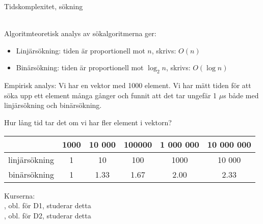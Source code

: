 \begin{Slide}{Tidskomplexitet, sökning}\SlideFontSmall

\\Algoritmteoretisk analys av sökalgoritmerna ger:
\begin{itemize}
\item Linjärsökning: tiden är proportionell mot $n$, skrivs: $O(n)$
\item Binärsökning:  tiden är proportionell mot $\log_2 n$, skrivs: $O(\log n)$
\end{itemize}
\vspace{1em}\pause
Empirisk analys: Vi har en vektor med 1000 element. Vi har mätt tiden för att söka upp ett element många gånger och funnit att det tar ungefär 1 $\mu$s både med linjärsökning och binärsökning.
\\\vspace{1em}

\noindent Hur lång tid tar det om vi har fler element i vektorn?\\

\vspace{1em}
\begin{tabular}{rccccc}
       & 1000 & 10 000 & 100000 & 1 000 000 & 10 000 000 \\ \hline
linjärsökning & 1     & 10     & 100     & 1000     & 10 000 \\
binärsökning  & 1     & 1.33   & 1.67    & 2.00     & 2.33
\end{tabular}
\vspace{1em}

{\small\SlideFontTiny

\noindent Kurserna: \\
, obl. för D1, studerar detta \\
, obl. för D2, studerar detta 
}
\end{Slide}
